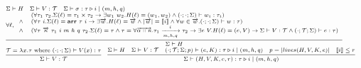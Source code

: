 \documentclass[fleqn]{article}
\begin{document}
\[
\scriptsize
\begin{array}{l}
	\Sigma \vdash H \hspace{1em} \Sigma \vdash V : \mathcal{T} \hspace{1em} \Sigma \vdash \sigma : \tau \triangleright i \mid (m, h, q) \\
	\infer{\Sigma \vdash H}{\forall \ell, \begin{array}{cl} & (\forall \tau_1~\tau_2. \Sigma(\ell) = \tau_1 \times \tau_2 \rightarrow \exists w_1~w_2. H(\ell) = (w_1,w_2) \land (\cdot;\cdot;\Sigma) \vdash w_i : \tau_i ) \\
	\land & (\forall \tau~i. \Sigma(\ell)= \mathbf{arr}~\tau~i \rightarrow \exists \overrightarrow{w}. H(\ell) = \overrightarrow{w} \land |\overrightarrow{w}| = \llbracket i \rrbracket \land \forall w \in \overrightarrow{w}. (\cdot;\cdot;\Sigma) \vdash w : \tau  ) \\
	\land & (\forall \tau~\overrightarrow{\kappa}~\tau_1~i~m~h~q~\tau_2. \Sigma(\ell)=\tau \land \tau=\forall \overrightarrow{\alpha::\kappa}. \tau_1 \xrightarrow[m,h,q]{i} \tau_2 \rightarrow \exists e~V. H(\ell) = (e, V) \rightarrow \Sigma \vdash V : \mathcal{T} \land (\cdot;\mathcal{T};\Sigma) \vdash e : \tau  ) \end{array} } \\
\infer{\Sigma \vdash V : \mathcal{T}}{\mathcal{T} = \lambda x. \tau \mathrm{~where~} (\cdot;\cdot;\Sigma) \vdash V(x) : \tau   } \hspace{1em}
\infer{\Sigma \vdash (H,V,K,e,r) : \tau \triangleright i \mid (m , h,q)}{\Sigma \vdash H & \Sigma \vdash V : \mathcal{T} & (\cdot;\mathcal{T};\Sigma;p) \vdash (e,K) : \tau \triangleright i \mid (m,h,q) & p = |lives(H,V,K,e)| & \llbracket i \rrbracket \le r }
\end{array}
\]
\end{document}
